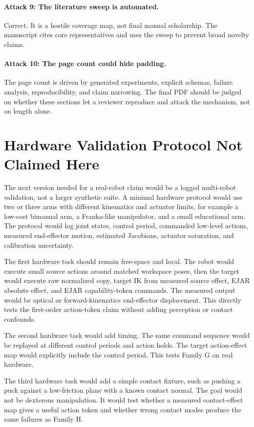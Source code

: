\documentclass{article}
\begin{document}
\paragraph{Attack 9: The literature sweep is automated.}
Correct. It is a hostile coverage map, not final manual scholarship. The manuscript cites core representatives and uses the sweep to prevent broad novelty claims.

\paragraph{Attack 10: The page count could hide padding.}
The page count is driven by generated experiments, explicit schemas, failure analysis, reproducibility, and claim narrowing. The final PDF should be judged on whether these sections let a reviewer reproduce and attack the mechanism, not on length alone.

\section{Hardware Validation Protocol Not Claimed Here}

The next version needed for a real-robot claim would be a logged multi-robot validation, not a larger synthetic suite. A minimal hardware protocol would use two or three arms with different kinematics and actuator limits, for example a low-cost bimanual arm, a Franka-like manipulator, and a small educational arm. The protocol would log joint states, control period, commanded low-level actions, measured end-effector motion, estimated Jacobians, actuator saturation, and calibration uncertainty.

The first hardware task should remain free-space and local. The robot would execute small source actions around matched workspace poses, then the target would execute raw normalized copy, target IK from measured source effect, EJAR absolute effect, and EJAR capability-token commands. The measured output would be optical or forward-kinematics end-effector displacement. This directly tests the first-order action-token claim without adding perception or contact confounds.

The second hardware task would add timing. The same command sequence would be replayed at different control periods and action holds. The target action-effect map would explicitly include the control period. This tests Family G on real hardware.

The third hardware task would add a simple contact fixture, such as pushing a puck against a low-friction plane with a known contact normal. The goal would not be dexterous manipulation. It would test whether a measured contact-effect map gives a useful action token and whether wrong contact modes produce the same failures as Family H.
\end{document}
